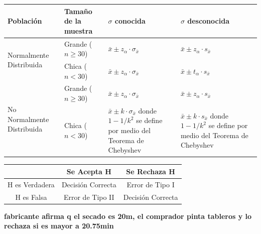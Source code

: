 \documentclass[10pt,a4paper]{article}
\begin{document}
\begin{center}
\small
\renewcommand{\arraystretch}{1.2}
\begin{tabular}{|p{2.6cm}|p{3.1cm}|p{4.2cm}|p{4.2cm}|}
\hline
Población & Tamaño de la muestra & $\sigma$ conocida & $\sigma$ desconocida \\
\hline
\multirow{2}{=}{Normalmente Distribuida}
  & Grande ($n \geq 30$) & \centering $\bar{x} \pm z_\alpha \cdot \sigma_{\bar{x}}$ & \centering\arraybackslash $\bar{x} \pm z_\alpha \cdot s_{\bar{x}}$ \\
\cline{2-4}
  & Chica ($n < 30$)     & \centering $\bar{x} \pm z_\alpha \cdot \sigma_{\bar{x}}$ & \centering\arraybackslash $\bar{x} \pm t_\alpha \cdot s_{\bar{x}}$ \\
\hline
\multirow{2}{=}{No Normalmente Distribuida}
  & Grande ($n \geq 30$) & \centering $\bar{x} \pm z_\alpha \cdot \sigma_{\bar{x}}$ & \centering\arraybackslash $\bar{x} \pm z_\alpha \cdot s_{\bar{x}}$ \\
\cline{2-4}
  & Chica ($n < 30$)     & $\bar{x} \pm k \cdot \sigma_{\bar{x}}$ \newline donde $1-1/k^2$ se define por medio del Teorema de Chebyshev
                         & $\bar{x} \pm k \cdot s_{\bar{x}}$ \newline donde $1-1/k^2$ se define por medio del Teorema de Chebyshev \\
\hline
\end{tabular}
\end{center}

\vspace{-4pt}
\begin{center}
\small
\renewcommand{\arraystretch}{1.2}
\begin{tabular}{|c|c|c|}
\hline
 & Se Acepta H & Se Rechaza H \\
\hline
H es Verdadera & Decisión Correcta & Error de Tipo I \\
\hline
H es Falsa & Error de Tipo II & Decisión Correcta \\
\hline
\end{tabular}
\end{center}

\textbf{fabricante afirma q el secado es 20m, el comprador pinta tableros y lo rechaza si es mayor a 20.75min}
\end{document}
